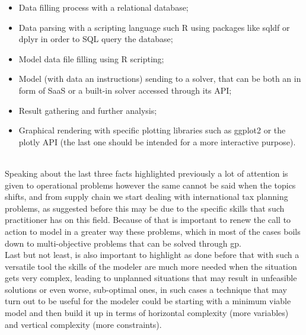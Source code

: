 \begin{doublespace}
\begin{itemize}
    \item Data filling process with a relational database;
    \item Data parsing with a scripting language such R using packages like sqldf\cite{Rsqldf_2017} or dplyr\cite{Rdplyr} in order to SQL query the database;
    \item Model data file filling using R scripting;
    \item Model (with data an instructions) sending to a solver, that can be both an in form of SaaS or a built-in solver accessed through its API;
    \item Result gathering and further analysis; 
    \item Graphical rendering with specific plotting libraries such as ggplot2\cite{Rggplot2_2009} or the plotly\cite{Rplotly_2017} API (the last one should be intended for a more interactive purpose).
\end{itemize}
\\
Speaking about the last three facts highlighted previously a lot of attention is given to operational problems however the same cannot be said when the topics shifts, and from supply chain we start dealing with international tax planning problems, as suggested before this may be due to the specific skills that such practitioner has on this field. Because of that is important to renew the call to action to model in a greater way these problems, which in most of the cases boils down to multi-objective problems that can be solved through \gls{gp}.
\\
Last but not least, is also important to highlight as done before that with such a versatile tool the skills of the modeler are much more needed when the situation gets very complex, leading to unplanned situations that may result in unfeasible solutions or even worse, sub-optimal ones, in such cases a technique that may turn out to be useful for the modeler could be starting with a minimum viable model and then build it up in terms of horizontal complexity (more variables) and vertical complexity (more constraints).

\pagebreak

\end{doublespace}
